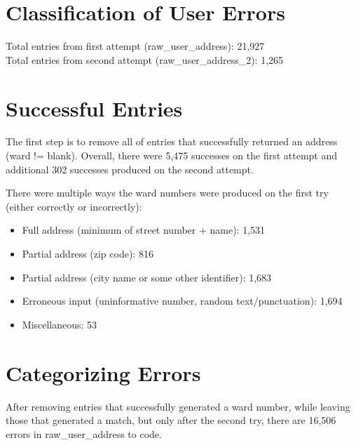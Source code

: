 \documentclass[12pt]{article}
\begin{document}
\section{Classification of User Errors}
Total entries from first attempt (raw\_user\_address): 21,927
\\Total entries from second attempt (raw\_user\_address\_2): 1,265

\section{Successful Entries}
The first step is to remove all of entries that successfully returned an address (ward != blank). Overall, there were  5,475 successes on the first attempt and additional 302 successes produced on the second attempt. 


There were multiple ways the ward numbers were produced on the first try (either correctly or incorrectly):
\begin{itemize}
\item Full address (minimum of street number + name): 1,531
\item Partial address (zip code): 816
\item Partial address (city name or some other identifier): 1,683
\item Erroneous input (uninformative number, random text/punctuation): 1,694
\item Miscellaneous: 53
\end{itemize}


\section{Categorizing Errors}
After removing entries that successfully generated a ward number, while leaving those that generated a match, but only after the second try, there are 16,506 errors in raw\_user\_address to code.

\iffalse
\begin{tabular}{ r|c|c| }
\multicolumn{1}{r}{}
 &  \multicolumn{1}{c}{}
 & \multicolumn{1}{c}{} \\
\cline{2-3}
 &  &  \\
\cline{2-3}
 &  &  \\
\cline{2-3}
\end{tabular}
\fi
\end{document}
